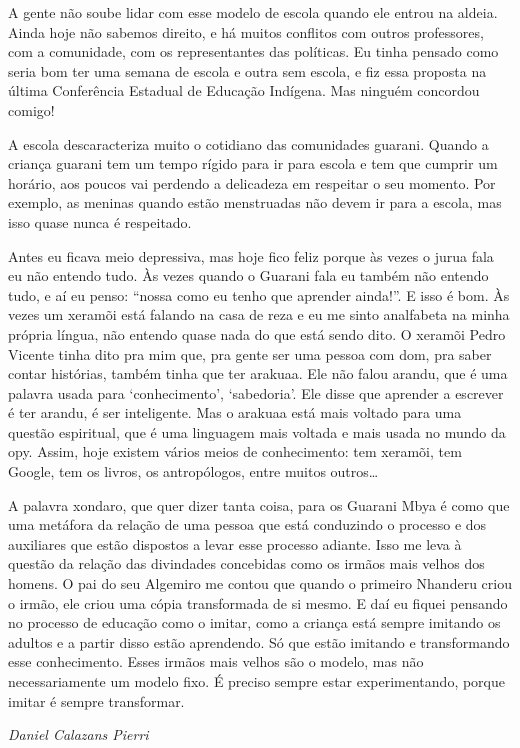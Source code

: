 A gente não soube lidar com esse modelo de escola quando ele entrou na
aldeia. Ainda hoje não sabemos direito, e há muitos conflitos com
outros professores, com a comunidade, com os representantes das
políticas. Eu tinha pensado como seria bom ter uma semana de escola e
outra sem escola, e fiz essa proposta na última Conferência Estadual de
Educação Indígena. Mas ninguém concordou comigo!

A escola descaracteriza muito o cotidiano das comunidades guarani.
Quando a criança guarani tem um tempo rígido para ir para escola e tem
que cumprir um horário, aos poucos vai perdendo a delicadeza em
respeitar o seu momento. Por exemplo, as meninas quando estão
menstruadas não devem ir para a escola, mas isso quase nunca é
respeitado.

Antes eu ficava meio depressiva, mas hoje fico feliz porque às vezes o
jurua fala eu não entendo tudo. Às vezes quando o Guarani fala eu
também não entendo tudo, e aí eu penso: ``nossa como eu tenho que
aprender ainda!''. E isso é bom. Às vezes um xeramõi está falando na
casa de reza e eu me sinto analfabeta na minha própria língua, não
entendo quase nada do que está sendo dito. O xeramõi Pedro Vicente
tinha dito pra mim que, pra gente ser uma pessoa com dom, pra saber
contar histórias, também tinha que ter arakuaa. Ele não falou arandu,
que é uma palavra usada para ‘conhecimento’, ‘sabedoria’. Ele disse que
aprender a escrever é ter arandu, é ser inteligente. Mas o arakuaa está
mais voltado para uma questão espiritual, que é uma linguagem mais
voltada e mais usada no mundo da opy. Assim, hoje existem vários meios
de conhecimento: tem xeramõi, tem Google, tem os livros, os
antropólogos, entre muitos outros\ldots{}

A palavra xondaro, que quer dizer tanta coisa, para os Guarani Mbya é
como que uma metáfora da relação de uma pessoa que está conduzindo o
processo e dos auxiliares que estão dispostos a levar esse processo
adiante. Isso me leva à questão da relação das divindades concebidas
como os irmãos mais velhos dos homens. O pai do seu Algemiro me contou
que quando o primeiro Nhanderu criou o irmão, ele criou uma cópia
transformada de si mesmo. E daí eu fiquei pensando no processo de
educação como o imitar, como a criança está sempre imitando os adultos
e a partir disso estão aprendendo. Só que estão imitando e
transformando esse conhecimento. Esses irmãos mais velhos são o modelo,
mas não necessariamente um modelo fixo. É preciso sempre estar
experimentando, porque imitar é sempre transformar.
\medskip
\begin{flushright}
\emph{Daniel Calazans Pierri} 
\end{flushright}

